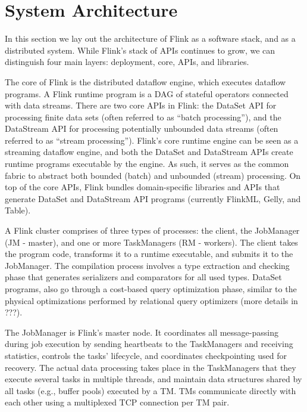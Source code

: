 
\section{System Architecture}

In this section we lay out the architecture of Flink as a software stack, and as a distributed system. While Flink's stack of APIs continues to grow, we can distinguish four main layers: deployment, core, APIs, and libraries.

 The core of Flink is the distributed dataflow engine, which executes dataflow programs. A Flink runtime program is a DAG of stateful operators connected with data streams. There are two core APIs in Flink: the DataSet API for processing finite data sets (often referred to as “batch processing”), and the DataStream API for processing potentially unbounded data streams (often referred to as “stream processing”). Flink’s core runtime engine can be seen as a streaming dataflow engine, and both the DataSet and DataStream APIs create runtime programs executable by the engine. As such, it serves as the common fabric to abstract both bounded (batch) and unbounded (stream) processing. On top of the core APIs, Flink bundles domain-specific libraries and APIs that generate DataSet and DataStream API programs (currently FlinkML, Gelly, and Table). 

A Flink cluster comprises of three types of processes: the client, the JobManager (JM - master), and one or more TaskManagers (RM - workers). The client takes the program code, transforms it to a runtime executable, and submits it to the JobManager. The compilation process involves a type extraction and checking phase that generates serializers and comparators for all used types. DataSet programs, also go through a cost-based query optimization phase, similar to the physical optimizations performed by relational query optimizers (more details in ???).

The JobManager is Flink’s master node. It coordinates all message-passing during job execution by sending heartbeats to the TaskManagers and receiving statistics, controls the tasks’ lifecycle, and coordinates checkpointing used for recovery. The actual data processing takes place in the TaskManagers that they execute several tasks in multiple threads, and maintain data structures shared by all tasks (e.g., buffer pools) executed by a TM. TMs communicate directly with each other using a multiplexed TCP connection per TM pair. 




